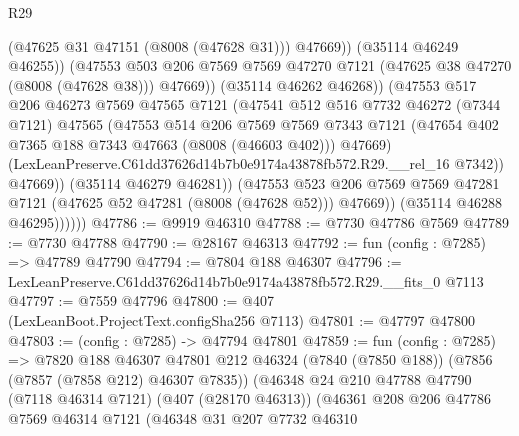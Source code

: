 \begin{lexlean}{R29}
\begin{coremodule}
                              (@47625 @31 @47151 (@8008 (@47628 @31)))
                              @47669))
                          (@35114 @46249 @46255))
                        (@47553
                          @503
                          @206
                          @7569
                          @7569
                          @47270
                          @7121
                          (@47625 @38 @47270 (@8008 (@47628 @38)))
                          @47669))
                      (@35114 @46262 @46268))
                    (@47553
                      @517
                      @206
                      @46273
                      @7569
                      @47565
                      @7121
                      (@47541
                        @512
                        @516
                        @7732
                        @46272
                        (@7344 @7121)
                        @47565
                        (@47553
                          @514
                          @206
                          @7569
                          @7569
                          @7343
                          @7121
                          (@47654 @402 @7365 @188 @7343 @47663 (@8008 (@46603 @402)))
                          @47669)
                        (LexLeanPreserve.C61dd37626d14b7b0e9174a43878fb572.R29.__rel_16 @7342))
                      @47669))
                  (@35114 @46279 @46281))
                (@47553
                  @523
                  @206
                  @7569
                  @7569
                  @47281
                  @7121
                  (@47625 @52 @47281 (@8008 (@47628 @52)))
                  @47669))
              (@35114 @46288 @46295))))))
@47786 := @9919 @46310
@47788 := @7730 @47786 @7569
@47789 := @7730 @47788
@47790 := @28167 @46313
@47792 := fun (config : @7285) => @47789 @47790
@47794 := @7804 @188 @46307
@47796 := LexLeanPreserve.C61dd37626d14b7b0e9174a43878fb572.R29.__fits_0 @7113
@47797 := @7559 @47796
@47800 := @407 (LexLeanBoot.ProjectText.configSha256 @7113)
@47801 := @47797 @47800
@47803 := (config : @7285) -> @47794 @47801
@47859 := fun (config : @7285) =>
  @7820
    @188
    @46307
    @47801
    @212
    @46324
    (@7840 (@7850 @188))
    (@7856 (@7857 (@7858 @212) @46307 @7835))
    (@46348
      @24
      @210
      @47788
      @47790
      (@7118 @46314 @7121)
      (@407 (@28170 @46313))
      (@46361
        @208
        @206
        @47786
        @7569
        @46314
        @7121
        (@46348
          @31
          @207
          @7732
          @46310

\end{coremodule}
\end{lexlean}
